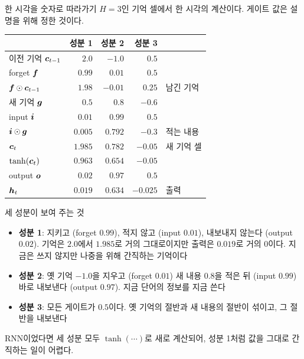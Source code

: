 \documentclass[aspectratio=169,11pt]{beamer}
\begin{document}
\begin{frame}{한 시각을 숫자로 따라가기}
$H=3$인 기억 셀에서 한 시각의 계산이다. 게이트 값은 설명을 위해 정한 것이다.
\vskip2mm
\centering
\small
\begin{tabular}{@{}lrrrl@{}}
\toprule
& 성분 1 & 성분 2 & 성분 3 & \\
\midrule
이전 기억 $\bm{c}_{t-1}$ & $2.0$ & $-1.0$ & $0.5$ & \\
forget $\bm{f}$ & $0.99$ & $0.01$ & $0.5$ & \\
$\bm{f}\odot\bm{c}_{t-1}$ & $1.98$ & $-0.01$ & $0.25$ & 남긴 기억 \\
새 기억 $\bm{g}$ & $0.5$ & $0.8$ & $-0.6$ & \\
input $\bm{i}$ & $0.01$ & $0.99$ & $0.5$ & \\
$\bm{i}\odot\bm{g}$ & $0.005$ & $0.792$ & $-0.3$ & 적는 내용 \\
$\bm{c}_t$ & $1.985$ & $0.782$ & $-0.05$ & 새 기억 셀 \\
$\tanh(\bm{c}_t)$ & $0.963$ & $0.654$ & $-0.05$ & \\
output $\bm{o}$ & $0.02$ & $0.97$ & $0.5$ & \\
$\bm{h}_t$ & $0.019$ & $0.634$ & $-0.025$ & 출력 \\
\bottomrule
\end{tabular}
\end{frame}

\begin{frame}{세 성분이 보여 주는 것}
\begin{itemize}
\item \textbf{성분 1}: 지키고 (forget $0.99$), 적지 않고 (input $0.01$), 내보내지 않는다 (output $0.02$).
기억은 $2.0$에서 $1.985$로 거의 그대로이지만 출력은 $0.019$로 거의 $0$이다.
지금은 쓰지 않지만 나중을 위해 간직하는 기억이다
\item \textbf{성분 2}: 옛 기억 $-1.0$을 지우고 (forget $0.01$) 새 내용 $0.8$을 적은 뒤 (input $0.99$)
바로 내보낸다 (output $0.97$). 지금 단어의 정보를 지금 쓴다
\item \textbf{성분 3}: 모든 게이트가 $0.5$이다.
옛 기억의 절반과 새 내용의 절반이 섞이고, 그 절반을 내보낸다
\end{itemize}
\vskip2mm
\begin{keybox}
RNN이었다면 세 성분 모두 $\tanh(\cdots)$로 새로 계산되어,
성분 1처럼 값을 그대로 간직하는 일이 어렵다.
\end{keybox}
\end{frame}
\end{document}
